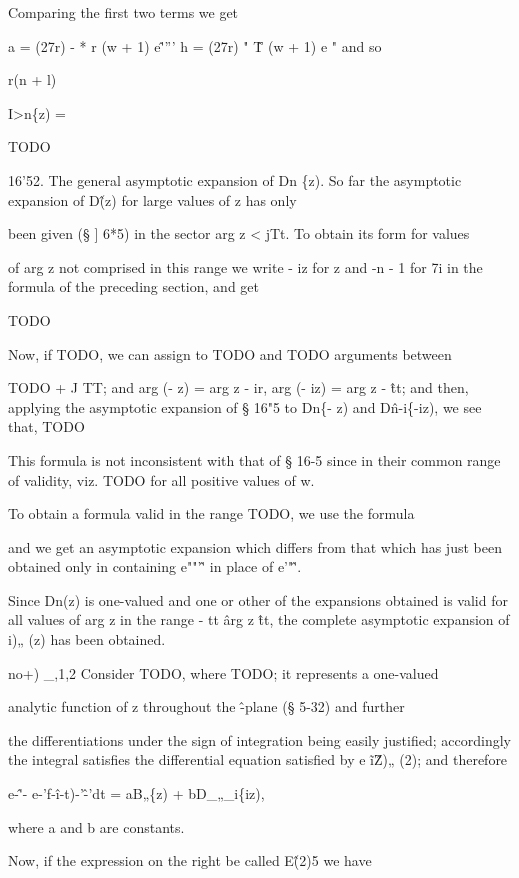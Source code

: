 Comparing the first two terms we get

a = (27r) - * r (w + 1) e\^'''' h = (27r) " \^ T (w + 1) e " and so

r(n + l)

I>n\{z) =

TODO

16'52. The general asymptotic expansion of Dn \{z). So far the
asymptotic expansion of D\^ (z) for large values of z has only

been given (§ ] 6*5) in the sector arg z < jTt. To obtain its form for
values

of arg z not comprised in this range we write - iz for z and -n - 1
for 7i in the formula of the preceding section, and get

TODO

Now, if TODO, we can assign to TODO and TODO arguments between

TODO + J TT; and arg (- z) = arg z - ir, arg (- iz) = arg z - \^tt;
and then, applying the asymptotic expansion of § 16"5 to Dn\{- z) and
D\^n-i\{-iz), we see that, TODO

%
%

This formula is not inconsistent with that of § 16-5 since in their
common range of validity, viz. TODO for all positive values of w.

To obtain a formula valid in the range TODO, we use the formula

and we get an asymptotic expansion which differs from that which has
just been obtained only in containing e""'\^' in place of e'"\^'.

Since Dn(z) is one-valued and one or other of the expansions obtained
is valid for all values of arg z in the range - tt \^ arg z \^tt, the
complete asymptotic expansion of i)„ (z) has been obtained.


no+) \_,1,2 Consider TODO, where TODO; it represents a one-valued

analytic function of z throughout the \^-plane (§ 5-32) and further

the differentiations under the sign of integration being easily
justified; accordingly the integral satisfies the differential
equation satisfied by e \~ i\^ Z)„ (2); and therefore

e-\^'- e-'f-\^i-t)-'\^-'dt = aB„\{z) + bD\_„\_i\{iz),

where a and b are constants.

Now, if the expression on the right be called E\^ (2)5 we have

